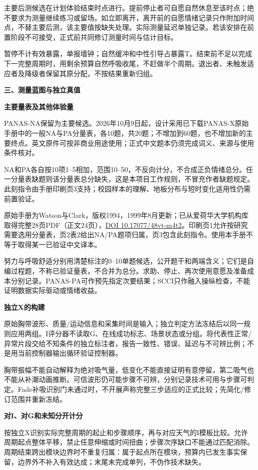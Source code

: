 \documentclass[11pt,a4paper]{article}
\newcommand{\reviewsection}[1]{\par\Needspace{6\baselineskip}\begin{center}{\titlelatin\titlecjk\bfseries\fontsize{14}{20}\selectfont #1}\end{center}}
\newcommand{\reviewsubsection}[1]{\par\Needspace{4\baselineskip}\begin{center}{\titlelatin\titlecjk\bfseries\fontsize{12}{18}\selectfont #1}\end{center}}
\begin{document}
主要后测候选在计划体验结束时点进行。提前停止者可自愿自然休息至该时点；绝不要求为测量继续练习或留场。如立即离开，离开前的自愿情绪记录只作附加时间点，不替主要后测，该主要值按缺失处理。实际测量延迟单独记录。若该安排在前置阶段不可接受，正式前共同修订测量时间与估计目标。

暂停不计有效暴露，单报墙钟；自然缓冲和中性引导占暴露T。结束前不足以完成下一完整周期时，用剩余预算自然呼吸收尾，不赶做半个周期。退出者、未触发适应者及降级者保留其原分配，不按结果重新归组。

\reviewsection{三、测量蓝图与独立真值}
\reviewsubsection{3.1 主要量表及其他体验量}
PANAS-NA保留为主要候选。2026年10月9日起，设计采用已下载PANAS-X原始手册中的一般NA与PA分量表，各10题，共20题；不增加到60题，也不增加新的主要终点。英文原件可按非商业用途使用；正式中文题本仍须完成词义、来源与使用条件核对。

NA和PA各自按10项1--5相加，范围10--50，不反向计分，不合成正负情绪总分。任一分量表缺题则该分量表总分缺失，这是本项目工作规则，不冒充作者缺题规定。此刻指令由手册印刷页3支持；校园样本的理解、地板分布与短时变化适用性仍需前置验证。

原始手册为Watson与Clark，版权1994，1999年8月更新；已从爱荷华大学机构库取得完整28页PDF（正文24页），\href{https://doi.org/10.17077/48vt-m4t2}{DOI 10.17077/48vt-m4t2}。印刷页1允许按研究需要选用分量表，页2表2给出NA/PA题项归属，页3包含此刻指令。使用本手册不等于取得某一已验证中文译本。

努力与呼吸舒适分别用清楚标注的0--10单题候选，公开题干和两端含义；它们是自编过程题，不称已验证量表，不合并为总分。求助、停止、再次使用意愿及准备成本分别记录。PANAS-PA可作预先指定次要结果；SCCI只作融入操纵检查，不能证明数据实际驱动或情绪收益。

\reviewsubsection{3.2 独立X的构建}
原始胸带波形、质量/运动信息和采集时间是输入；独立判定方法冻结后以同一规则应用两组。I评分器不读取G、在线成功标志、场景状态或分组。将代表性正常/异常片段交给不知条件的独立标注者，报告一致性、错误、延迟与不可辨比例；不是用当前控制器输出循环验证控制器。

胸带振幅不能自动解释为绝对吸气量，低变化不能直接证明有意停留，第二吸气也不能从补潮动画推断。可信波形仍可能步骤不可辨，分别记录技术可用与步骤可判定。Fade补吸识别门未通过时，不开展声称完整三步适应的正式比较；先简化/修订范围并重新冻结。

\reviewsubsection{3.3 对I、对G和未知分开计分}
按独立X识别实际完整周期的起止和步骤顺序，再与对应天气的I模板比较。允许周期起点整体平移，禁止任意伸缩或时间扭曲；步骤次序缺口不能通过匹配消除。周期结束跨出模块边界时不重复归属：属于起点所在模块，预算内已发生事实保留，边界外不补入有效达成；末尾未完成单列，不伪作技术缺失。
\end{document}
